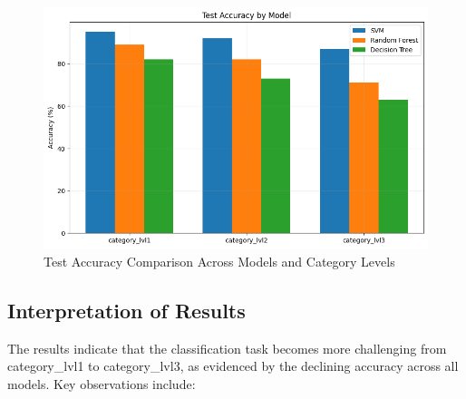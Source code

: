 \documentclass[10pt]{article}
\begin{document}
\begin{figure}[H]
    \centering
    \includegraphics[width=1\textwidth]{modeltest.png}
    \caption{Test Accuracy Comparison Across Models and Category Levels}
\end{figure}

\subsection{Interpretation of Results}
The results indicate that the classification task becomes more challenging from category\_lvl1 to category\_lvl3, as evidenced by the declining accuracy across all models. Key observations include:
\end{document}
